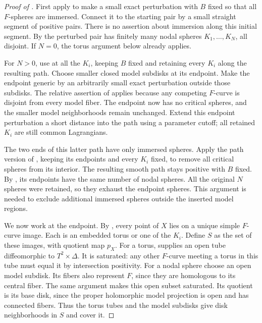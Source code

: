 \begin{proof}[Proof of ]
First apply  to make a small exact perturbation
with $B$ fixed so that all $F$-spheres are immersed.  Connect it to
the starting pair by a small straight segment of positive pairs.
There is no assertion about immersion along this initial segment.
By  the perturbed pair has finitely many
nodal spheres $K_1,\ldots,K_N$, all disjoint.  If $N=0$, the torus
argument below already applies.

For $N>0$, use  at all the $K_i$, keeping
$B$ fixed and retaining every $K_i$ along the resulting path.
Choose smaller closed model subdisks at its endpoint.  Make the
endpoint generic by an arbitrarily small exact perturbation outside
those subdisks.  The relative assertion of 
applies because any competing $F$-curve is disjoint from every
model fiber.  The endpoint now has no critical spheres, and the
smaller model neighborhoods remain unchanged.  Extend this endpoint
perturbation a short distance into the path using a parameter cutoff;
all retained $K_i$ are still common Lagrangians.

The two ends of this latter path have only immersed spheres.  Apply
the path version of , keeping its endpoints
and every $K_i$ fixed, to remove all critical spheres from its
interior.  The resulting smooth path stays positive with $B$ fixed.
By , its endpoints have the same number
of nodal spheres.  All the original $N$ spheres were retained, so
they exhaust the endpoint spheres.  This argument is needed to
exclude additional immersed spheres outside the inserted model
regions.

We now work at the endpoint.  By , every
point of $X$ lies on a unique simple $F$-curve image.  Each is an
embedded torus or one of the $K_i$.  Define $S$ as the set of these
images, with quotient map $p_X$.  For a torus,
 supplies an open tube diffeomorphic to
$T^2\times\Delta$.  It is saturated: any other $F$-curve meeting
a torus in this tube must equal it by intersection positivity.
For a nodal sphere choose an open model subdisk.  Its fibers also
represent $F$, since they are homologous to its central fiber.
The same argument makes this open subset saturated.  Its quotient
is its base disk, since the proper holomorphic model projection is
open and has connected fibers.  Thus the torus tubes and the model
subdisks give disk neighborhoods in $S$ and cover it.


\end{proof}
